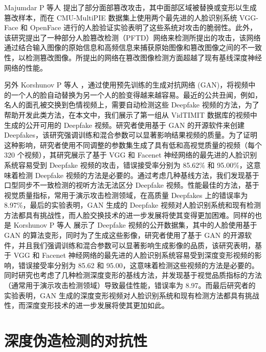 Majumdar P 等人 \cite{majumdar2019evading} 提出了部分面部篡改攻击，其中面部区域被替换或变形以生成篡改样本，而在 CMU-MultiPIE 数据集上使用两个最先进的人脸识别系统 VGG-Face 和 OpenFace 进行的人脸验证实验表明了这些系统对攻击的脆弱性。此外，该研究提出了一种部分人脸篡改检测（PFTD）网络来检测所提出的攻击，该网络通过结合输入图像的原始信息和高频信息来捕获原始图像和篡改图像之间的不一致性，以检测篡改图像。所提出的网络在篡改图像检测方面超越了现有基线深度神经网络的性能。

另外 Korshunov P 等人 \cite{korshunov2018deepfakes}，通过使用预先训练的生成对抗网络 (GAN)，将视频中的一个人的脸自动替换为另一个人的脸变得越来越容易。最近的公共丑闻，例如，名人的面孔被交换到色情视频上，需要自动检测这些 Deepfake 视频的方法，为了帮助开发此类方法，在本文中，我们展示了第一组从 VidTIMIT 数据库的视频中生成的公开可用的 Deepfake 视频。研究者使用基于 GAN 的开源软件来创建 Deepfakes，该研究强调训练和混合参数可以显著影响结果视频的质量。为了证明这种影响，研究者使用不同调整的参数集生成了具有低和高视觉质量的视频（每个 320 个视频），其研究展示了基于 VGG 和 Facenet 神经网络的最先进的人脸识别系统容易受到 Deepfake 视频的攻击，错误接受率分别为 85.62\% 和 95.00\%，这意味着检测 Deepfake 视频的方法是必要的。通过考虑几种基线方法，我们发现基于口型同步不一致检测的视听方法无法区分 Deepfake 视频。性能最佳的方法，基于视觉质量指标，常用于演示攻击检测领域，在高质量 Deepfakes 上的错误率为 8.97\%，最后的实验表明，GAN 生成的 Deepfake 视频对人脸识别系统和现有检测方法都具有挑战性，而人脸交换技术的进一步发展将使其变得更加困难。同样的也是 Korshunov P 等人 \cite{korshunov2019vulnerability} 展示了 Deepfake 视频的公开数据集，其中的人脸使用基于 GAN 的算法变形，同时为了生成这些影像，研究者使用了基于 GAN 的开源软件，并且我们强调训练和混合参数可以显著影响生成影像的品质，该研究表明，基于 VGG 和 Facenet 神经网络的最先进的人脸识别系统容易受到深度变形视频的影响，错误接受率分别为 85.62 和 95.00，这意味着检测这些视频的方法是必要的。同时研究也考虑了几种检测深度变形的基线方法，并发现基于视觉品质指标的方法（通常用于演示攻击检测领域）导致最佳性能，错误率为 8.97。而最后研究者的实验表明，GAN 生成的深度变形视频对人脸识别系统和现有检测方法都具有挑战性，而深度变形技术的进一步发展将使其更加如此。


\section{深度伪造检测的对抗性}

